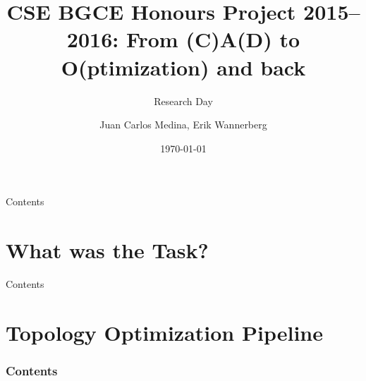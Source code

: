 \documentclass[9pt,pdftex]{beamer}
\title{CSE BGCE Honours Project 2015–2016: From (C)A(D) to O(ptimization) and back}
\subtitle{Research Day}
\author[J. Medina, E. Wannerberg] {
Juan Carlos Medina, Erik Wannerberg} %
\date{\today}
\institute{Technische Universität München}
\begin{document}
\frame{\maketitle}


\begin{frame}{Contents}
\setcounter{tocdepth}{1}
\tableofcontents
\end{frame}

\section{What was the Task?}








\begin{frame}{Contents}
\setcounter{tocdepth}{1}
\tableofcontents
\end{frame}



\section{Topology Optimization Pipeline}

  \begin{frame}
    \setcounter{tocdepth}{2}
  \frametitle{Contents}
  \tableofcontents[currentsection]
  \end{frame}

% 
\end{document}

